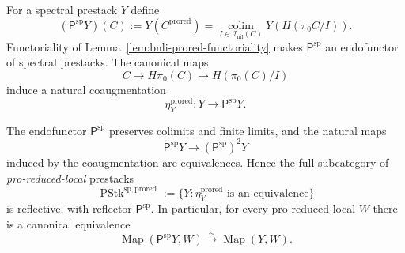 \begin{construction}
\label{con:bnli-prored-endofunctor}
For a spectral prestack $Y$ define
\[
\boxed{
    (\mathsf P^{\mathrm{sp}}Y)(C)
    :=
    Y(C^{\mathrm{prored}})
    =
    \operatorname*{colim}_{I\in\mathcal I_{\mathrm{nil}}(C)}
    Y\!\left(H(\pi_0C/I)\right).}
\]
Functoriality of Lemma~\ref{lem:bnli-prored-functoriality} makes
$\mathsf P^{\mathrm{sp}}$ an endofunctor of spectral prestacks.  The canonical
maps
\[
    C\longrightarrow H\pi_0(C)\longrightarrow H(\pi_0(C)/I)
\]
induce a natural coaugmentation
\[
\boxed{
    \eta_Y^{\mathrm{prored}}:
    Y\longrightarrow \mathsf P^{\mathrm{sp}}Y.}
\]
\end{construction}

\begin{theorem}
\label{thm:bnli-prored-localization}
The endofunctor $\mathsf P^{\mathrm{sp}}$ preserves colimits and finite
limits, and the natural maps
\[
    \mathsf P^{\mathrm{sp}}Y
    \longrightarrow
    (\mathsf P^{\mathrm{sp}})^2Y
\]
induced by the coaugmentation are equivalences.  Hence the full subcategory
of \emph{pro-reduced-local} prestacks
\[
    \operatorname{PStk}^{\mathrm{sp,prored}}
    :=
    \{Y:\eta_Y^{\mathrm{prored}}\text{ is an equivalence}\}
\]
is reflective, with reflector $\mathsf P^{\mathrm{sp}}$.  In particular, for
every pro-reduced-local $W$ there is a canonical equivalence
\[
\boxed{
    \operatorname{Map}(\mathsf P^{\mathrm{sp}}Y,W)
    \xrightarrow{\sim}
    \operatorname{Map}(Y,W).}
\]
\end{theorem}

